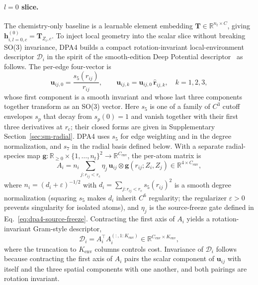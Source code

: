 \paragraph{$l=0$ slice.}
The chemistry-only baseline is a learnable element embedding $\mathbf{T}\in\mathbb{R}^{n_t\times C}$, giving $\mathbf{h}_{i,l=0,c}^{(0)}=\mathbf{T}_{Z_i,c}$.
To inject local geometry into the scalar slice without breaking SO(3) invariance, DPA4 builds a compact rotation-invariant local-environment descriptor $\mathcal{D}_i$ in the spirit of the smooth-edition Deep Potential descriptor~\cite{zhang2018end} as follows.
The per-edge four-vector is
\begin{equation}
    \mathbf{u}_{ij,0} = \frac{s_5(r_{ij})}{r_{ij}},
    \qquad
    \mathbf{u}_{ij,k} = \mathbf{u}_{ij,0}\,\widehat{\mathbf{r}}_{ij,k},\quad k=1,2,3,
    \label{eq:dpa4-env-vector}
\end{equation}
whose first component is a smooth invariant and whose last three components
together transform as an SO(3) vector. Here $s_5$ is one of a family of $C^3$
cutoff envelopes $s_p$ that decay from $s_p(0)=1$ and vanish together with
their first three derivatives at $r_{\mathrm{c}}$; their closed forms are given
in Supplementary Section~\ref{sec:sm-radial}.
DPA4 uses $s_5$ for edge weighting and in the degree normalization, and $s_7$ in the radial basis defined below.
With a separate
radial-species map
$\mathbf{g}:\mathbb{R}_{\ge 0}\times\{1,\dots,n_t\}^2\to\mathbb{R}^{C_{\mathrm{env}}}$,
the per-atom matrix is
\begin{equation}
    A_i = n_i\sum_{j:r_{ij}<r_{\mathrm{c}}} \eta_j\,
    \mathbf{u}_{ij}\otimes \mathbf{g}(r_{ij};Z_i,Z_j)
    \in\mathbb{R}^{4\times C_{\mathrm{env}}},
    \label{eq:dpa4-env-matrix}
\end{equation}
where $n_i=(d_i+\varepsilon)^{-1/2}$ with
$d_i=\sum_{j:r_{ij}<r_{\mathrm{c}}} s_5(r_{ij})^2$ is a smooth degree
normalization (squaring $s_5$ makes $d_i$ inherit $C^6$ regularity; the
regularizer $\varepsilon>0$ prevents singularity for isolated atoms), and
$\eta_j$ is the source-freeze gate defined in
Eq.~\eqref{eq:dpa4-source-freeze}. Contracting the first axis of $A_i$ yields
a rotation-invariant Gram-style descriptor,
\begin{equation}
    \mathcal{D}_i = A_i^{\top}
    A_i^{(:,1{:}K_{\mathrm{env}})} \in\mathbb{R}^{C_{\mathrm{env}}\times K_{\mathrm{env}}}, \label{eq:dpa4-env-descriptor} \end{equation} where the truncation to $K_{\mathrm{env}}$ columns controls cost.
Invariance of $\mathcal{D}_i$ follows because contracting the first axis of $A_i$ pairs the scalar component of $\mathbf{u}_{ij}$ with itself and the three spatial components with one another, and both pairings are rotation invariant.
